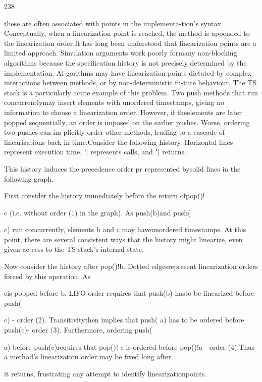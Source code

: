 238

these are often associated with points in the implementa-tion's syntax. Conceptually, when a linearization point is
reached, the method is appended to the linearization order.It has long been understood that linearization points are
a limited approach. Simulation arguments work poorly formany non-blocking algorithms because the specification history is not precisely determined by the implementation. Al-gorithms may have linearization points dictated by complex
interactions between methods, or by non-deterministic fu-ture behaviour. The TS stack is a particularly acute example
of this problem. Two push methods that run concurrentlymay insert elements with unordered timestamps, giving no
information to choose a linearization order. However, if theelements are later popped sequentially, an order is imposed
on the earlier pushes. Worse, ordering two pushes can im-plicitly order other methods, leading to a cascade of linearizations back in time.Consider the following history. Horizontal lines represent
execution time, !| represents calls, and "| returns.

This history induces the precedence order pr represented bysolid lines in the following graph.

First consider the history immediately before the return ofpop()!

c (i.e. without order (1) in the graph). As push(b)and push(

c) run concurrently, elements b and c may haveunordered timestamps. At this point, there are several consistent ways that the history might linearize, even given ac-cess to the TS stack's internal state.

Now consider the history after pop()!b. Dotted edgesrepresent linearization orders forced by this operation. As

cis popped before
b, LIFO order requires that push(b) hasto be linearized before push(

c) - order (2). Transitivitythen implies that push(
a) has to be ordered before push(c)- order (3). Furthermore, ordering push(

a) before push(c)requires that pop()!
c is ordered before pop()!a - order (4).Thus a method's linearization order may be fixed long after

it returns, frustrating any attempt to identify linearizationpoints.

